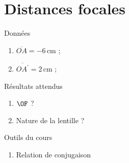 \documentclass[../main/main.tex]{subfiles}
\begin{document}
\section{Distances focales}
\begin{NCdefi}{Données}
	\begin{enumerate}
		\item $\overline{OA} = -6\,$cm ;
		\item $\overline{OA^\prime} = 2\,$cm ;
	\end{enumerate}
\end{NCdefi}

\begin{NCprop}{Résultats attendus}
	\begin{enumerate}
		\item $\OF$ ?
		\item Nature de la lentille ?
	\end{enumerate}
\end{NCprop}

\begin{NCdemo}{Outils du cours}
	\begin{enumerate}
		\item Relation de conjugaison
	\end{enumerate} 
\end{NCdemo}
\end{document}
